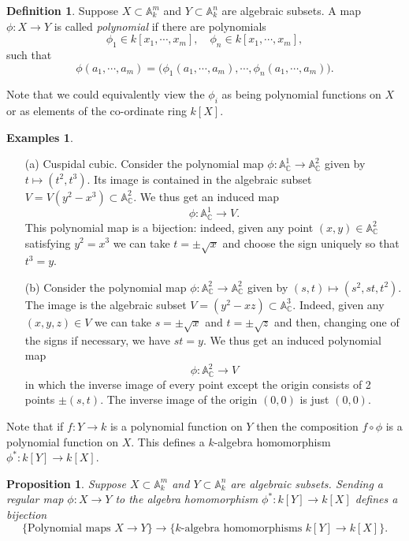 \documentclass [12pt,oneside,a4paper,mathscr]{amsart}
\newtheorem{prop}[thm]{Proposition}
\theoremstyle{definition}
\newtheorem{defn}[thm]{Definition}
\newtheorem{examples}[thm]{Examples}
\newcommand {\A}{\mathbb A}
\newcommand {\C}{\mathbb C}
\begin{document}
\begin{defn}
Suppose $X\subset \A^{m}_k$ and $Y\subset \A^{n}_k$ are algebraic subsets. A map $\phi\colon X \to Y$ is called \emph{polynomial} if there are polynomials
\[\phi_1\in k[x_1,\cdots,x_m], \quad \phi_n\in k[x_1,\cdots,x_m],\]
such that
\[\phi(a_1, \cdots, a_m)=\big(\phi_1(a_1,\cdots, a_m), \cdots, \phi_{n}(a_1,\cdots, a_m)\big).\]
\end{defn}

Note that we could equivalently view the $\phi_i$ as being polynomial functions on $X$ or as elements of the co-ordinate ring $k[X]$.

\begin{examples}
\label{cusp}
\begin{itemize}
\item[(a)] {\rm Cuspidal cubic.} Consider the polynomial map $\phi\colon \A^1_\C \to \A^2_\C$ given by $t\mapsto (t^2,t^3)$. Its image is contained in the algebraic subset $V=V(y^2-x^3)\subset \A^2_\C$. We thus get an induced map
\[\phi\colon \A^1_\C \to V.\]
This polynomial map is a bijection: indeed, given any point $(x,y)\in \A^2_\C$ satisfying $y^2=x^3$ we can take $t=\pm \sqrt{x}$ and choose the sign uniquely so that $t^3=y$.




\smallskip


\item[(b)] Consider the polynomial map $\phi\colon \A^2_\C \to \A^2_\C$ given by $(s,t)\mapsto (s^2,st,t^2)$.
The image is the algebraic subset $V=(y^2-xz)\subset \A^3_\C$. Indeed, given any $(x,y,z)\in V$ we can take $s=\pm\sqrt{x}$ and $t=\pm \sqrt{z}$ and then, changing one of the signs if necessary, we have $st=y$. We thus get an induced polynomial map
\[\phi\colon \A^2_\C \to V\]
in which the inverse image of every point except the origin consists of 2 points $\pm(s,t)$. The inverse image of the origin $(0,0)$ is just $(0,0)$.
\end{itemize}
\end{examples}








Note that if $f\colon Y\to k$ is a polynomial function on $Y$ then the composition $f\circ \phi$ is a polynomial function on $X$. This defines a $k$-algebra homomorphism $\phi^*\colon k[Y]\to k[X]$.




\begin{prop}
Suppose $X\subset \A^{m}_k$ and $Y\subset \A^{n}_k$ are algebraic subsets.
Sending a regular map $\phi\colon X \to Y$ to the algebra homomorphism $\phi^*\colon k[Y]\to k[X]$ defines a bijection
\[\big\{\text{Polynomial maps }X\to Y\big\} \to \big\{k\text{-algebra homomorphisms }k[Y]\to k[X]\big\}.\]
\end{prop}
\end{document}
